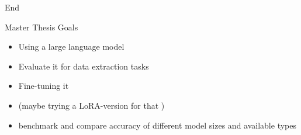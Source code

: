 
\addtocounter{framenumber}{1}
\begin{frame}[standout]
    \Huge
    End
\end{frame}

\appendix
\backupbegin


\begin{frame}[c]{Master Thesis Goals}
    \large
    \begin{itemize}[<+(1)->]
        \item Using a large language model
        \item Evaluate it for data extraction tasks
        \item Fine-tuning it
        \item (maybe trying a LoRA-version for that \cite{hu_lora_2021})
        \item benchmark and compare accuracy of different model sizes and available types
    \end{itemize}
\end{frame}

\backupend

